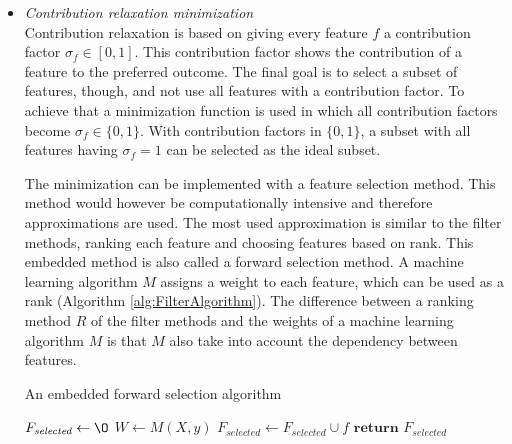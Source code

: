 \documentclass[10pt,a4paper]{article}
\begin{document}
	
	\begin{itemize}
		\item \textit{Contribution relaxation minimization} \\
		
		Contribution relaxation is based on giving every feature $f$ a contribution factor $\sigma_f \in [0, 1]$. This contribution factor shows the contribution of a feature to the preferred outcome. The final goal is to select a subset of features, though, and not use all features with a contribution factor. To achieve that a minimization function is used in which all contribution factors become $\sigma_f \in \{0, 1\}$. With contribution factors in $\{0, 1\}$, a subset with all features having $\sigma_f = 1$ can be selected as the ideal subset\cite{Lal2006}. 
		
		The minimization can be implemented with a feature selection method. This method would however be computationally intensive and therefore approximations are used. The most used approximation is similar to the filter methods, ranking each feature and choosing features based on rank. This embedded method is also called a forward selection method. A machine learning algorithm $M$ assigns a weight to each feature, which can be used as a rank (Algorithm \ref{alg:FilterAlgorithm}). The difference between a ranking method $R$ of the filter methods and the weights of a machine learning algorithm $M$ is that $M$ also take into account the dependency between features\cite{Lal2006}.
		
		\begin{algorithm}[H]
			\caption{An embedded forward selection algorithm\cite{Lal2006}}\label{alg:EmbeddedForwardSelectionAlgorithm}
			\begin{algorithmic}[1]
				\State $F_{\textit{selected}} \gets \O$ 	
				\State $W \gets M(X, y)$					
				 					
							
				\State $F_{\textit{selected}} \gets F_{\textit{selected}} \cup f$ 
				\EndIf
				\EndFor
				\State $\textbf{return } F_{\textit{selected}}$
				\EndProcedure
			\end{algorithmic}
		\end{algorithm}
		

\end{itemize}
\end{document}
